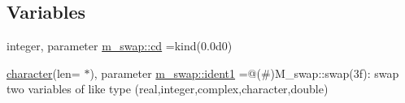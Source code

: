 \subsection*{Variables}
\begin{DoxyCompactItemize}
\item 
integer, parameter \hyperlink{namespacem__swap_af14229bde3625fba5d65e401fd16c3d1}{m\+\_\+swap\+::cd} =kind(0.\+0d0)
\item 
\hyperlink{option__stopwatch_83_8txt_abd4b21fbbd175834027b5224bfe97e66}{character}(len= $\ast$), parameter \hyperlink{namespacem__swap_a01034a0ba775ff397c911bd715dd6d3f}{m\+\_\+swap\+::ident1} =\textquotesingle{}@(\#)M\+\_\+swap\+::swap(3f)\+: swap two variables of like type (real,integer,complex,character,double)\textquotesingle{}
\end{DoxyCompactItemize}
